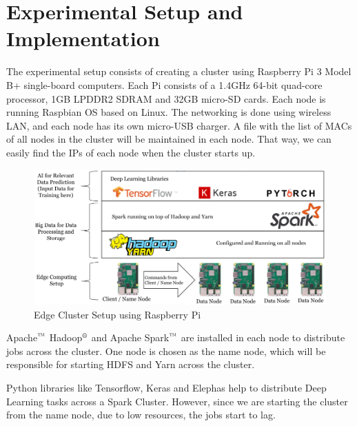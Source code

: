 \documentclass[conference]{IEEEtran}
\begin{document}
\section{Experimental Setup and Implementation}

The experimental setup consists of creating a cluster using Raspberry Pi 3 Model B+ single-board computers. Each Pi consists of a 1.4GHz 64-bit quad-core processor, 1GB LPDDR2 SDRAM and 32GB micro-SD cards. Each node is running Raspbian OS based on Linux. The networking is done using wireless LAN, and each node has its own micro-USB charger. A file with the list of MACs of all nodes in the cluster will be maintained in each node. That way, we can easily find the IPs of each node when the cluster starts up.

\begin{figure}[!b]
\centering
\includegraphics[width = 0.5 \textwidth,]{./img/edge_cluster.png}
\caption{\label{fig:edge_cluster} Edge Cluster Setup using Raspberry Pi}
\end{figure}


Apache$\textsuperscript{\texttrademark}$ Hadoop$\textsuperscript{\textregistered}$ and Apache Spark$\textsuperscript{\texttrademark}$ are installed in each node to distribute jobs across the cluster. One node is chosen as the name node, which will be responsible for starting HDFS and Yarn across the cluster.

Python libraries like Tensorflow, Keras and Elephas help to distribute Deep Learning tasks across a Spark Cluster. However, since we are starting the cluster from the name node, due to low resources, the jobs start to lag.



\end{document}
